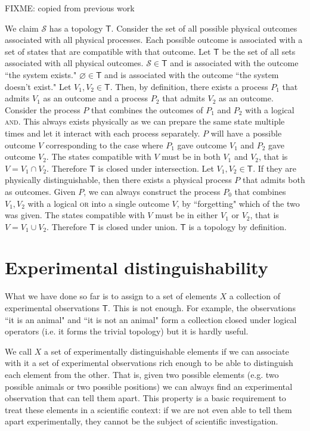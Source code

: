 \documentclass[11pt,letterpaper,fleqn]{memoir} %
\begin{document}
\begin{justification}
	FIXME: copied from previous work
	
	We claim $\mathcal{S}$ has a topology $\mathsf{T}$. Consider the set of all possible physical outcomes associated with all physical processes. Each possible outcome is associated with a set of states that are compatible with that outcome. Let $\mathsf{T}$ be the set of all sets associated with all physical outcomes. $\mathcal{S} \in \mathsf{T}$ and is associated with the outcome ``the system exists." $\varnothing \in \mathsf{T}$ and is associated with the outcome ``the system doesn't exist." Let $V_1, V_2 \in \mathsf{T}$. Then, by definition, there exists a process $P_1$ that admits $V_1$ as an outcome and a process $P_2$ that admits $V_2$ as an outcome. Consider the process $P$ that combines the outcomes of $P_1$ and $P_2$ with a logical \textsc{and}. This always exists physically as we can prepare the same state multiple times and let it interact with each process separately. $P$ will have a possible outcome $V$ corresponding to the case where $P_1$ gave outcome $V_1$ and $P_2$ gave outcome $V_2$. The states compatible with $V$ must be in both $V_1$ and $V_2$, that is $V = V_1 \cap V_2$. Therefore $\mathsf{T}$ is closed under intersection. Let $V_1, V_2 \in \mathsf{T}$. If they are physically distinguishable, then there exists a physical process $P$ that admits both as outcomes. Given $P$, we can always construct the process $P_0$ that combines $V_1, V_2$ with a logical \textsc{or} into a single outcome $V$, by ``forgetting" which of the two was given. The states compatible with $V$ must be in either $V_1$ or $V_2$, that is $V = V_1 \cup V_2$. Therefore $\mathsf{T}$ is closed under union. $\mathsf{T}$ is a topology by definition.
\end{justification}


\section{Experimental distinguishability}

What we have done so far is to assign to a set of elements $X$ a collection of experimental observations $\mathsf{T}$. This is not enough. For example, the observations ``it is an animal" and ``it is not an animal" form a collection closed under logical operators (i.e. it forms the trivial topology) but it is hardly useful.

We call $X$ a set of experimentally distinguishable elements if we can associate with it a set of experimental observations rich enough to be able to distinguish each element from the other. That is, given two possible elements (e.g. two possible animals or two possible positions) we can always find an experimental observation that can tell them apart. This property is a basic requirement to treat these elements in a scientific context: if we are not even able to tell them apart experimentally, they cannot be the subject of scientific investigation.
\end{document}
